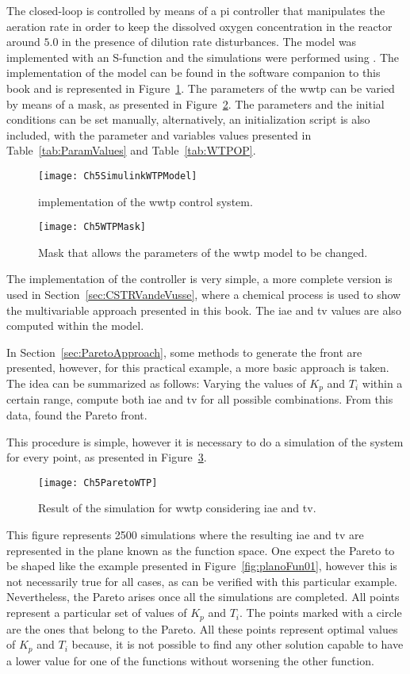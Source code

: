 The closed-loop is controlled by means of a \gls{pi} controller that manipulates the aeration rate in order to keep the dissolved oxygen concentration in the reactor around $5.0$ in the presence of dilution rate disturbances. The model was implemented with an S-function and the simulations were performed using \simulink. The implementation of the model can be found in the software companion to this book and is represented in Figure~\ref{fig:Ch5SimulinkWTPModel}. The parameters of the \gls{wwtp} can be varied by means of a mask, as presented in Figure~\ref{fig:Ch5WTPMask}. The parameters and the initial conditions can be set manually, alternatively, an initialization script is also included, with the parameter and variables values presented in Table~\ref{tab:ParamValues} and Table~\ref{tab:WTPOP}.
%
\begin{figure}[tb]
	\centering
	\texttt{[image: Ch5SimulinkWTPModel]}
	\caption{\simulink implementation of the \gls{wwtp} control system.}
	\label{fig:Ch5SimulinkWTPModel}
\end{figure}
%
\begin{figure}[tb]
	\centering
	\texttt{[image: Ch5WTPMask]}
	\caption{Mask that allows the parameters of the \gls{wwtp} model to be changed.}
	\label{fig:Ch5WTPMask}
\end{figure}

The implementation of the controller is very simple, a more complete version is used in Section~\ref{sec:CSTRVandeVusse}, where a chemical process is used to show the multivariable approach presented in this book. The \gls{iae} and \gls{tv} values are also computed within the \simulink{} model.

In Section~\ref{sec:ParetoApproach}, some methods to generate the front are presented, however, for this practical example, a more basic approach is taken. The idea can be summarized as follows: Varying the values of $K_p$ and $T_i$ within a certain range, compute both \gls{iae} and \gls{tv} for all possible combinations. From this data, found the Pareto front.

This procedure is simple, however it is necessary to do a simulation of the system for every point, as presented in Figure~\ref{fig:Ch5ParetoWTP}. %
\begin{figure}
	\centering
	\texttt{[image: Ch5ParetoWTP]}
	\caption{Result of the simulation for \gls{wwtp} considering \gls{iae} and \gls{tv}.}
	\label{fig:Ch5ParetoWTP}
\end{figure}
%
This figure represents 2500 simulations where the resulting \gls{iae} and \gls{tv} are represented in the plane known as the function space. One expect the Pareto to be shaped like the example presented in Figure~\ref{fig:planoFun01}, however this is not necessarily true for all cases, as can be verified with this particular example. Nevertheless, the Pareto arises once all the simulations are completed. All points represent a particular set of values of $K_p$ and $T_i$. The points marked with a circle are the ones that belong to the Pareto. All these points represent optimal values of $K_p$ and $T_i$ because, it is not possible to find any other solution capable to have a lower value for one of the functions without worsening the other function.

